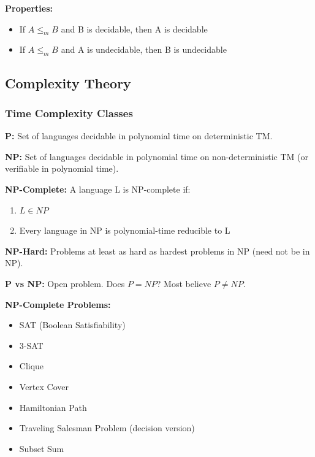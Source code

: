 \documentclass[11pt,a4paper]{article}
\begin{document}
\textbf{Properties:}
\begin{itemize}
    \item If $A \leq_m B$ and B is decidable, then A is decidable
    \item If $A \leq_m B$ and A is undecidable, then B is undecidable
\end{itemize}

\subsection{Complexity Theory}

\subsubsection{Time Complexity Classes}

\begin{defbox}
\textbf{P:} Set of languages decidable in polynomial time on deterministic TM.
\end{defbox}

\begin{defbox}
\textbf{NP:} Set of languages decidable in polynomial time on non-deterministic TM (or verifiable in polynomial time).
\end{defbox}

\begin{defbox}
\textbf{NP-Complete:} A language L is NP-complete if:
\begin{enumerate}
    \item $L \in NP$
    \item Every language in NP is polynomial-time reducible to L
\end{enumerate}
\end{defbox}

\begin{defbox}
\textbf{NP-Hard:} Problems at least as hard as hardest problems in NP (need not be in NP).
\end{defbox}

\begin{notebox}
\textbf{P vs NP:} Open problem. Does $P = NP$? Most believe $P \neq NP$.
\end{notebox}

\textbf{NP-Complete Problems:}
\begin{itemize}
    \item SAT (Boolean Satisfiability)
    \item 3-SAT
    \item Clique
    \item Vertex Cover
    \item Hamiltonian Path
    \item Traveling Salesman Problem (decision version)
    \item Subset Sum
\end{itemize}
\end{document}
